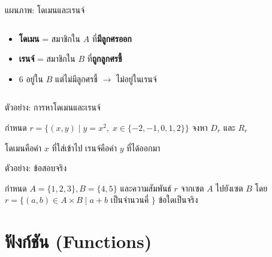 \documentclass[11pt, aspectratio=169]{beamer}
\begin{document}
\begin{frame}{แผนภาพ: โดเมนและเรนจ์}
\begin{columns}[T]
      \begin{intuition}[จำง่าย ๆ]
        \begin{itemize}
          \item \textbf{โดเมน} = สมาชิกใน $A$ ที่\textbf{มีลูกศรออก}
          \item \textbf{เรนจ์} = สมาชิกใน $B$ ที่\textbf{ถูกลูกศรชี้}
          \item $6$ อยู่ใน $B$ แต่ไม่มีลูกศรชี้ $\rightarrow$ ไม่อยู่ในเรนจ์
        \end{itemize}
      \end{intuition}
  \end{columns}
\end{frame}\begin{frame}[t]{ตัวอย่าง: การหาโดเมนและเรนจ์}
  \begin{exambox}[โจทย์]
    กำหนด $r = \{(x, y) \mid y = x^2,\; x \in \{-2, -1, 0, 1, 2\}\}$
    จงหา $D_r$ และ $R_r$
  \end{exambox}

  \vspace{\fill}

  \medskip
  \begin{intuition}[สังเกต]
    โดเมนคือค่า $x$ ที่ใส่เข้าไป เรนจ์คือค่า $y$ ที่ได้ออกมา
  \end{intuition}

\end{frame}\begin{frame}[t]{ตัวอย่าง: ข้อสอบจริง}
  \begin{exambox}[โจทย์ปี 68 ข้อ 10]
    กำหนด $A=\{1,2,3\}, B=\{4,5\}$ และความสัมพันธ์ $r$ จากเซต $A$ ไปยังเซต $B$ โดย $r=\{(a,b)\in A\times B\mid a+b$ เป็นจำนวนคี่ $\}$ ข้อใดเป็นจริง 
  \end{exambox}

  \vspace{\fill}

\end{frame}

\section{ฟังก์ชัน (Functions)}
\end{document}

